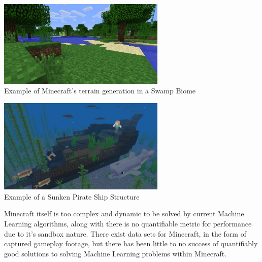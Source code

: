 \begin{flushleft}
                        \vspace{0.2cm}
                        \begin{center}
                        \includegraphics[width=8cm]{Images/InitialResearch/MCTerrainGeneration.jpg} \\
                        Example of Minecraft's terrain generation in a Swamp Biome \\ 
                        \vspace{0.2cm}

                        \includegraphics[width=8cm]{Images/InitialResearch/MCStructureGeneration.jpg} \\ 
                        Example of a Sunken Pirate Ship Structure \\
                        \vspace{0.2cm}
                        \end{center}
                        \vspace{0.2cm}

                        Minecraft itself is too complex and dynamic to be solved by current Machine Learning algorithms, along with there is no quantifiable 
                        metric for performance due to it's sandbox nature. There exist data sets for Minecraft, in the form of captured gameplay footage, but
                        there has been little to no success of quantifiably good solutions to solving Machine Learning problems within Minecraft. \\

                        \vspace{0.2cm}


\end{flushleft}
